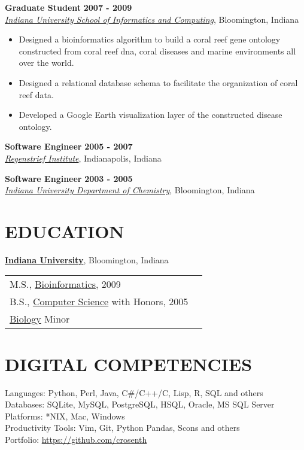 \documentclass{res}
\begin{document}
\begin{resume}
\textbf{Graduate Student} \hfill \textbf{2007 - 2009}\\
\href{http://www.informatics.indiana.edu/}{\textit{Indiana University School of Informatics and Computing}}, Bloomington, Indiana
\begin{itemize} \itemsep -2pt
\item Designed a bioinformatics algorithm to build a coral reef gene ontology constructed from coral reef dna, coral diseases and marine environments all over the world.
\item Designed a relational database schema to facilitate the organization of coral reef data.
\item Developed a Google Earth visualization layer of the constructed disease ontology.
\end{itemize}

\textbf{Software Engineer} \hfill \textbf{2005 - 2007}\\
\href{http://www.regenstrief.org/}{\textit{Regenstrief Institute}}, Indianapolis, Indiana

\textbf{Software Engineer} \hfill \textbf{2003 - 2005}\\
\href{http://chem.indiana.edu/}{\textit{Indiana University Department of Chemistry}}, Bloomington, Indiana

\section{EDUCATION}
\href{http://www.iub.edu/}{\textbf{Indiana University}}, Bloomington, Indiana\\
\begin{tabular}{p{10cm} l} 
M.S., \href{http://xavier.informatics.indiana.edu/gradsites/bio/masters/}{Bioinformatics}, 2009\\
B.S., \href{http://www.cs.indiana.edu/}{Computer Science} with Honors, 2005\\
\href{http://www.bio.indiana.edu/}{Biology} Minor
\end{tabular}

\section{DIGITAL COMPETENCIES} 
Languages: Python, Perl, Java, C\#/C++/C, Lisp, R, SQL and others\\
Databases: SQLite, MySQL, PostgreSQL, HSQL, Oracle, MS SQL Server\\
Platforms: *NIX, Mac, Windows\\
Productivity Tools: Vim, Git, Python Pandas, Scons and others\\
Portfolio: \url{https://github.com/crosenth}


\end{resume}
\end{document}
